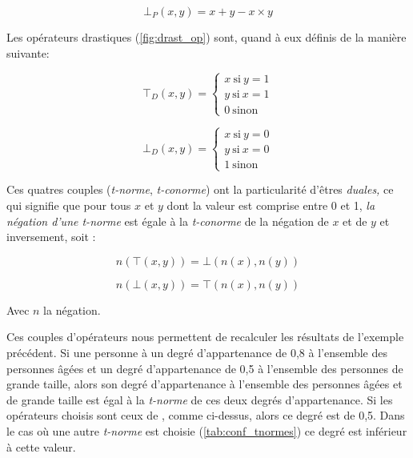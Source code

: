 \begin{equation}
  ⊥_P(x,y) = x+y - x×y
\end{equation}

Les opérateurs drastiques (\autoref{fig:drast_op}) sont, quand à eux
définis de la manière suivante:

\begin{equation}
  ⊤_D(x,y)  = \left \{
    \begin{array}{ll}
      x\ \text{si}\ y=1\\
      y\ \text{si}\ x=1\\
      0\ \text{sinon}
    \end{array}
  \right.
\end{equation}


\begin{equation}
  ⊥_D(x,y)  = \left \{
    \begin{array}{ll}
      x\ \text{si}\ y=0\\
      y\ \text{si}\ x=0\\
      1\ \text{sinon}
    \end{array}
  \right.
\end{equation}



Ces quatres couples (\emph{t-norme}, \emph{t-conorme}) ont la
particularité d'êtres \emph{duales,} ce qui signifie que pour tous
\(x\) et \(y\) dont la valeur est comprise entre 0 et 1, \emph{la négation
d'une \emph{t-norme}} est égale à la \emph{t-conorme} de la négation
de \(x\) et de \(y\) et inversement, soit :

\begin{equation}
  n(⊤(x,y)) = ⊥(n(x), n(y))
\end{equation}

\begin{equation}
  n(⊥(x,y)) = ⊤(n(x), n(y))
\end{equation}

Avec \(n\) la négation.

Ces couples d'opérateurs nous permettent de recalculer les résultats
de l'exemple précédent. Si une personne à un degré d'appartenance de
0,8 à l'ensemble des personnes âgées et un degré d'appartenance de 0,5
à l'ensemble des personnes de grande taille, alors son degré
d'appartenance à l'ensemble des personnes âgées et de grande taille
est égal à la \emph{t-norme} de ces deux degrés d'appartenance. Si les
opérateurs choisis sont ceux de \textcite{Zadeh1965}, comme ci-dessus,
alors ce degré est de 0,5. Dans le cas où une autre \emph{t-norme} est
choisie (\autoref{tab:conf_tnormes}) ce degré est inférieur à cette
valeur.

